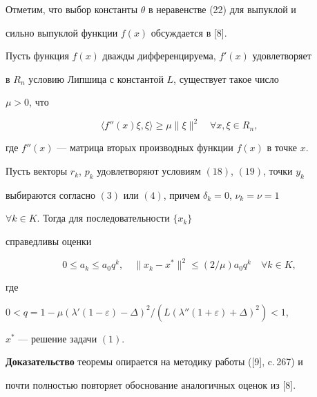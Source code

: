 




Отметим, что выбор константы $\theta $ в неравенстве (22) для выпуклой и


сильно выпуклой функции $f(x)$ обсуждается в [8].





\begin{thm}


Пусть функция $f(x)$ дважды дифференцируема, ${f}'(x)$ удовлетворяет


в $R_n$ условию Липшица с константой $L$, существует такое число


$\mu >0$, что


\begin{equation}


\langle{{f}''(x)\xi,\xi} \rangle \ge \mu \|{\xi} \|^2


\quad \forall x,\xi \in R_n,


\end{equation}


где ${f}''(x)$ --- матрица вторых производных функции $f(x)$ в точке $x$.


Пусть векторы $r_k$, $p_k$ удoвлетворяют условиям $(18)$, $(19)$, точки $y_k$


выбираются согласно $(3)$ или $(4)$, причем $\delta_k=0$, $\nu_k=\nu =1$


$\forall k\in K$. Тогда для последовательности $\{{x_k} \}$


справедливы оценки


\begin{equation}


0\le a_k\le a_0q^k,\quad \|{x_k-x^*} \|^2 \le (2/\mu)a_0q^k


\quad\forall k\in K,


\end{equation}


где


$0<q=1-\mu({\lambda}'(1-\varepsilon)-\Delta)^2/(L({\lambda}''


(1+\varepsilon)+\Delta)^2)<1$,


$x^*$ --- решение задачи $(1)$.


\end{thm}





{\bf Доказательство} теоремы опирается на методику работы ([9], c.\,267) и


почти полностью повторяет обоснование аналогичных оценок из [8].





